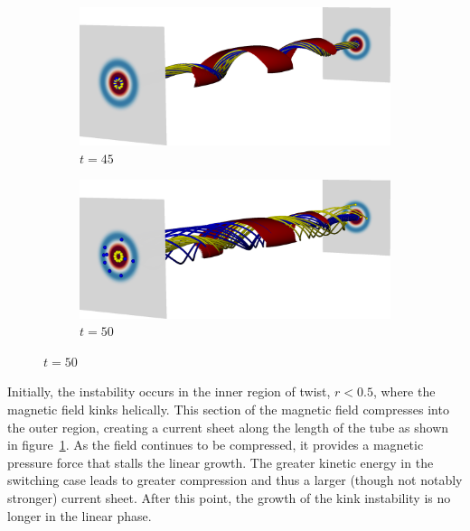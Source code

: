 \begin{figure}[t]
  \centering
    \begin{subfigure}{0.49\textwidth}
      \includegraphics[width=\linewidth]{field_line_plots/cropped/v1e-4r5e-4.5-isotropic_0009_cropped.png}
      \caption{$t=45$}
      \label{fig:field_lines_0009}
    \end{subfigure}
    \begin{subfigure}{0.49\textwidth}
      \includegraphics[width=\linewidth]{field_line_plots/cropped/v1e-4r5e-4.5-isotropic_0010_cropped.png}
      \caption{$t=50$}
      \label{fig:field_lines_0010}
    \end{subfigure}
\label{fig:reconnecting_field_lines}%
\end{figure}

Initially, the instability occurs in the inner region of twist, $r<0.5$, where the magnetic field kinks helically. This section of the magnetic field compresses into the outer region, creating a current sheet along the length of the tube as shown in figure~\ref{fig:field_lines_0009}. As the field continues to be compressed, it provides a magnetic pressure force that stalls the linear growth. The greater kinetic energy in the switching case leads to greater compression and thus a larger (though not notably stronger) current sheet. After this point, the growth of the kink instability is no longer in the linear phase.

